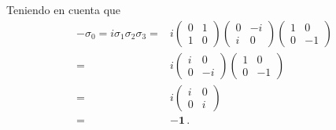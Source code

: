 Teniendo en cuenta que
\begin{align}
  -\sigma_0=i\sigma_1\sigma_2\sigma_3=&
  i\begin{pmatrix}
    0 & 1 \\
    1 & 0 
  \end{pmatrix}
  \begin{pmatrix}
    0 & -i \\
    i & 0
  \end{pmatrix}
  \begin{pmatrix}
    1 & 0 \\
    0 & -1
  \end{pmatrix}\nonumber\\
  =&
  i\begin{pmatrix}
    i & 0 \\
    0 & -i 
  \end{pmatrix}
  \begin{pmatrix}
    1 & 0 \\
    0 & -1
  \end{pmatrix}\nonumber\\
  =&i\begin{pmatrix}
    i & 0 \\
    0 & i
  \end{pmatrix}\nonumber\\
  =&-\mathbf{1}\,.
\end{align}
